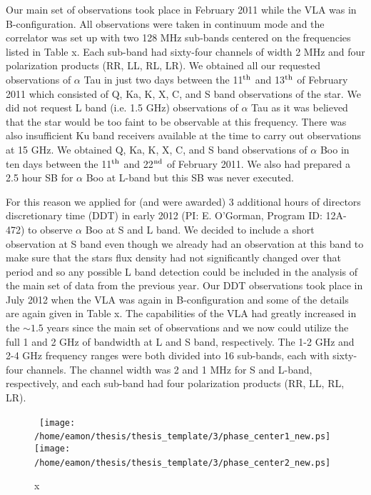 Our main set of observations took place in February 2011 while the VLA was in B-configuration. All observations were taken in continuum mode and the correlator was set up with two 128 MHz sub-bands centered on the frequencies listed in Table x. Each sub-band had sixty-four channels of width 2 MHz and four polarization products (RR, LL, RL, LR). We obtained all our requested observations of $\alpha$ Tau in just two days between the 11$^{\rm{th}}$ and 13$^{\rm{th}}$ of February 2011 which consisted of Q, Ka, K, X, C, and S band observations of the star. We did not request L band (i.e. 1.5 GHz) observations of $\alpha$ Tau as it was believed that the star would be too faint to be observable at this frequency. There was also insufficient Ku band receivers available at the time to carry out observations at 15 GHz. We obtained Q, Ka, K, X, C, and S band observations of $\alpha$ Boo in ten days between the 11$^{\rm{th}}$ and 22$^{\rm{nd}}$ of February 2011. We also had prepared a 2.5 hour SB for $\alpha$ Boo at L-band but this SB was never executed. 

For this reason we applied for (and were awarded) 3 additional hours of directors discretionary time (DDT) in early 2012 (PI: E. O'Gorman, Program ID: 12A-472) to observe $\alpha$ Boo at S and L band. We decided to include a short observation at S band even though we already had an observation at this band to make sure that the stars flux density had not significantly changed over that period and so any possible L band detection could be included in the analysis of the main set of data from the previous year. Our DDT observations took place in July 2012 when the VLA was again in B-configuration and some of the details are again given in Table x. The capabilities of the VLA had greatly increased in the $\sim 1.5$ years since the main set of observations and we now could utilize the full 1 and 2 GHz of bandwidth at L and S band, respectively. The 1-2 GHz and 2-4 GHz frequency ranges were both divided into 16 sub-bands, each with sixty-four channels. The channel width was 2 and 1 MHz for S and L-band, respectively, and each sub-band had four polarization products (RR, LL, RL, LR).

\begin{figure}[hbt!]
\centering 
\mbox{
          \texttt{[image: /home/eamon/thesis/thesis\_template/3/phase\_center1\_new.ps]}
          \texttt{[image: /home/eamon/thesis/thesis\_template/3/phase\_center2\_new.ps]}
          }
\caption[x]{x}
\label{}
\end{figure}


